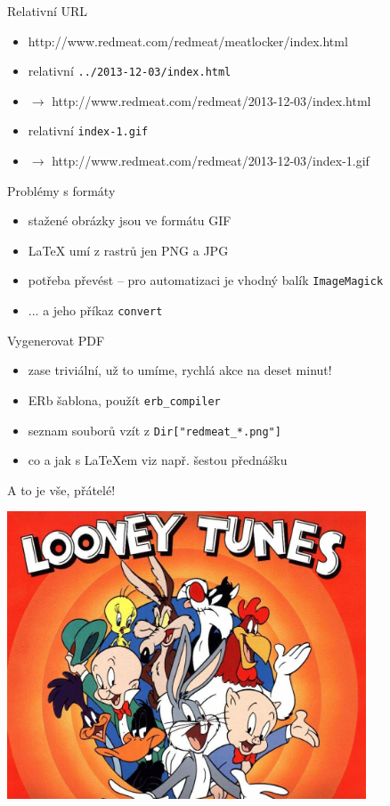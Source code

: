 \documentclass{beamer}
\begin{document}
\begin{frame}{Relativní URL}
  \begin{itemize}
    \item http://www.redmeat.com/redmeat/meatlocker/index.html
    \item relativní \texttt{../2013-12-03/index.html}
    \item $\to$ http://www.redmeat.com/redmeat/2013-12-03/index.html
    \item relativní \texttt{index-1.gif}
    \item $\to$ http://www.redmeat.com/redmeat/2013-12-03/index-1.gif
  \end{itemize}
\end{frame}

\begin{frame}{Problémy s formáty}
  \begin{itemize}
    \item stažené obrázky jsou ve formátu GIF
    \item LaTeX umí z rastrů jen PNG a JPG
    \item potřeba převést -- pro automatizaci je vhodný balík \texttt{ImageMagick}
    \item ... a jeho příkaz \texttt{convert}
  \end{itemize}
\end{frame}

\begin{frame}{Vygenerovat PDF}
  \begin{itemize}
    \item zase triviální, už to umíme, rychlá akce na deset minut!
    \item ERb šablona, použít \texttt{erb\_compiler}
    \item seznam souborů vzít z \texttt{Dir["redmeat\_*.png"]}
    \item co a jak s LaTeXem viz např. šestou přednášku
  \end{itemize}
\end{frame}

\begin{frame}{A to je vše, přátelé!}
  \begin{center}
    \includegraphics[width=0.8\textwidth]{looney_tunes}
  \end{center}
\end{frame}
\end{document}
